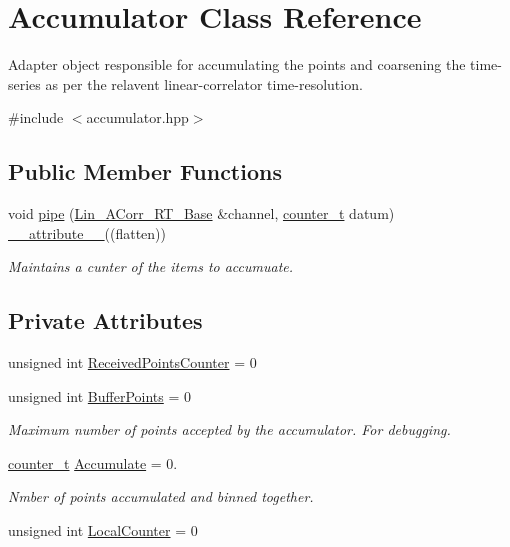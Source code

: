 \hypertarget{classAccumulator}{}\section{Accumulator Class Reference}
\label{classAccumulator}


Adapter object responsible for accumulating the points and coarsening the time-\/series as per the relavent linear-\/correlator time-\/resolution.  




{\ttfamily \#include $<$accumulator.\+hpp$>$}

\subsection*{Public Member Functions}
\begin{DoxyCompactItemize}
\item 
void \hyperlink{classAccumulator_aa1793bc1599bc2451fabc44954673164}{pipe} (\hyperlink{classLin__ACorr__RT__Base}{Lin\+\_\+\+A\+Corr\+\_\+\+R\+T\+\_\+\+Base} \&channel, \hyperlink{types_8hpp_ac89ac912f524b3e3fa3720ea55fec966}{counter\+\_\+t} datum) \hyperlink{utilities_8hpp_a103d5b3998e0dd804213c8f30a094f4d}{\+\_\+\+\_\+attribute\+\_\+\+\_\+}((flatten))
\begin{DoxyCompactList}\small\item\em Maintains a cunter of the items to accumuate. \end{DoxyCompactList}\end{DoxyCompactItemize}
\subsection*{Private Attributes}
\begin{DoxyCompactItemize}
\item 
unsigned int \hyperlink{classAccumulator_a9cc7c392e99778c99593f7798cb2ab3b}{Received\+Points\+Counter} = 0
\item 
unsigned int \hyperlink{classAccumulator_a559e4fac031df015e47248599740b33c}{Buffer\+Points} = 0
\begin{DoxyCompactList}\small\item\em Maximum number of points accepted by the accumulator. For debugging. \end{DoxyCompactList}\item 
\hyperlink{types_8hpp_ac89ac912f524b3e3fa3720ea55fec966}{counter\+\_\+t} \hyperlink{classAccumulator_a8e615af8b85dd2c8500d1f8c473879ab}{Accumulate} = 0.
\begin{DoxyCompactList}\small\item\em Nmber of points accumulated and binned together. \end{DoxyCompactList}\item 
unsigned int \hyperlink{classAccumulator_a753e3878c3078a11ee9bc13b6185ec60}{Local\+Counter} = 0
\end{DoxyCompactItemize}



